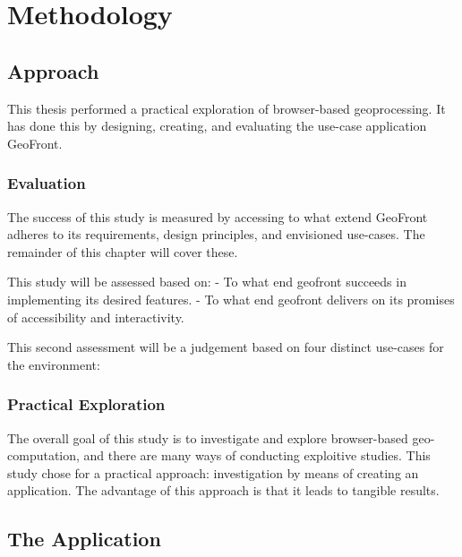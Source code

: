 \chapter{ Methodology }

\section{ Approach }

This thesis performed a practical exploration of browser-based geoprocessing. It has done this by designing, creating, and evaluating the use-case application GeoFront. 

\subsection{ Evaluation }
The success of this study is measured by accessing to what extend GeoFront adheres to its requirements, design principles, and envisioned use-cases. The remainder of this chapter will cover these.

This study will be assessed based on: 
- To what end geofront succeeds in implementing its desired features.
- To what end geofront delivers on its promises of accessibility and interactivity.

This second assessment will be a judgement based on four distinct use-cases for the environment:


\subsection{ Practical Exploration }
The overall goal of this study is to investigate and explore browser-based geo-computation, and there are many ways of conducting exploitive studies. 
This study chose for a practical approach: investigation by means of creating an application.
The advantage of this approach is that it leads to tangible results. 


\section { The Application }

